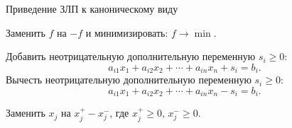 \documentclass[17pt]{extarticle}
\begin{document}
\begin{algorithm}
    \caption{Приведение ЗЛП к каноническому виду}
    \begin{algorithmic}[1]
        \State Заменить \( f \) на \( -f \) и минимизировать: \( f \to \min \).
        \EndIf

        \State Добавить неотрицательную дополнительную переменную \( s_i \geq 0 \):
        \[
            a_{i1}x_1 + a_{i2}x_2 + \cdots + a_{in}x_n + s_i = b_i.
        \]
        \State Вычесть неотрицательную дополнительную переменную \( s_i \geq 0 \):
        \[
            a_{i1}x_1 + a_{i2}x_2 + \cdots + a_{in}x_n - s_i = b_i.
        \]
        \EndIf
        \EndFor

        \State Заменить \( x_j \) на \( x_j^+ - x_j^- \), где \( x_j^+ \geq 0 \), \( x_j^- \geq 0 \).
        \EndIf
        \EndFor
    \end{algorithmic}
\end{algorithm}
\end{document}

